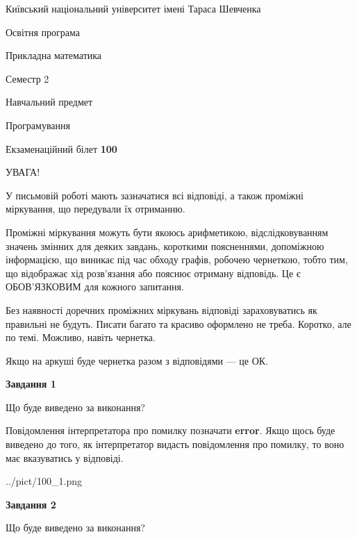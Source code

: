 \documentclass[12pt, ukrainian]{article}
\begin{document}
{{\begin {small}\par
{ \center  Київський національний університет імені Тараса Шевченка \par}
{\parbox {5 cm}{Освітня програма \hfill}{\parbox {7 cm}{Прикладна математика \hfill}}\parbox {6 cm}{\hfill Семестр 2}}\par
{\parbox {5 cm} {Навчальний предмет \hfill}\parbox {7 cm}{Програмування \hfill}\parbox {6cm}{\hfill}\par}\vspace{-7pt} \end{small}}{\center Екзаменаційний білет \No \textbf
{ 100 }\par}}
{
\begin {large}
УВАГА!

У письмовій роботі мають зазначатися всі відповіді, а також проміжні міркування, що передували їх отриманню.

Проміжні міркування можуть бути якоюсь арифметикою, відслідковуванням зна\-чень змінних для деяких завдань,
короткими поясненнями, допоміжною інформацією, що виникає під час обходу графів, робочею чернеткою,
тобто тим, що відображає хід розв’язання або пояснює отриману відповідь.
Це є ОБОВ’ЯЗКОВИМ для кожного запитання.

Без наявності доречних проміжних міркувань відповіді зараховуватись як правиль\-ні не будуть.
Писати багато та красиво оформлено не треба. Коротко, але по темі. Можли\-во, навіть чернетка.

Якщо на аркуші буде чернетка разом з відповідями --- це ОК.

\newpage

{\begin {center}\textbf{Завдання 1}\end {center}}\par
Що буде виведено за виконання?

Повідомлення інтерпретатора про помилку позначати \textbf{error}.
Якщо щось буде виведено до того, як інтерпретатор видасть повідомлення про помилку, 
то воно має вказуватись у відповіді. \par


\begin{center}
	{../pict/100_1.png}
\end{center}
\newpage

{\begin {center}\textbf{Завдання 2}\end {center}}\par
Що буде виведено за виконання?


\end{large}}
\end{document}
